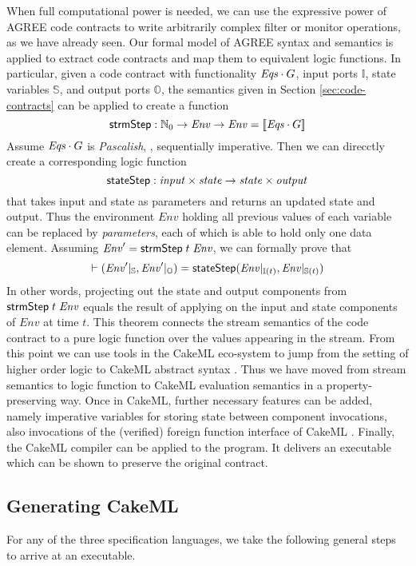 When full computational power is needed, we can use the expressive
power of AGREE code contracts to write arbitrarily complex filter or
monitor operations, as we have already seen. Our formal model of AGREE
syntax and semantics is applied to extract code contracts and map them
to equivalent logic functions. In particular, given a code contract with
functionality ${\mathit{Eqs}}\cdot G$, input ports $\mathbb{I}$, state
variables $\mathbb{S}$, and output ports $\mathbb{O}$, the semantics
given in Section \ref{sec:code-contracts} can be applied to create a
function
\[
 \mathsf{strmStep} : \mathbb{N}_0 \to \mathit{Env} \to \mathit{Env} = [\![ {\mathit{Eqs}}\cdot G ]\!]
\]
Assume ${\mathit{Eqs}}\cdot G$ is \emph{Pascalish}, \ie, sequentially
imperative. Then we can direcctly create a corresponding logic function
\[
\mathsf{stateStep} : \mathit{input} \times \mathit{state} \to \mathit{state} \times \mathit{output}
\]
that takes input and state as parameters and returns an updated state
and output. Thus the environment $\mathit{Env}$ holding all previous
values of each variable can be replaced by \emph{parameters}, each of
which is able to hold only one data element. Assuming
$\mathit{Env}' = \mathsf{strmStep}\;t\; \mathit{Env}$, we can formally prove that
\[
\vdash (\mathit{Env}' \vert_{\mathbb{S}},
 \mathit{Env}' \vert_{\mathbb{O}}) =
\mathsf{stateStep} (\mathit{Env}\vert_{\mathbb{I}(t)},
                   \mathit{Env}\vert_{\mathbb{S}(t)})
\]
In other words, projecting out the state and output components from
$\mathsf{strmStep}\;t\; \mathit{Env}$ equals the result of
applying  on the input and state components of
$\mathit{Env}$ at time $t$. This theorem connects the stream semantics
of the code contract to a pure logic function over the values
appearing in the stream. From this point we can use tools in the
CakeML eco-system to jump from the setting of higher order logic to
CakeML abstract syntax \cite{cakeml-translator}. Thus we have moved
from stream semantics to logic function to CakeML evaluation semantics
in a property-preserving way. Once in CakeML, further necessary
features can be added, namely imperative variables for storing state
between component invocations, also invocations of the (verified) foreign
function interface of CakeML \cite{cakeml-monadic}. Finally, the CakeML compiler can be
applied to the program. It delivers an executable which can be shown
to preserve the original contract.


\subsection{Generating CakeML}
For any of the three specification languages, we take the following general steps to
arrive at an executable.

